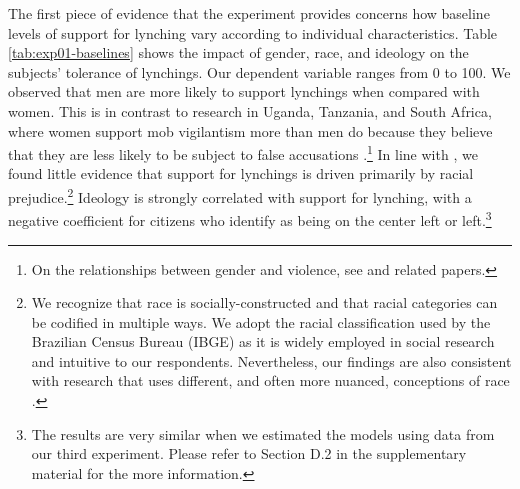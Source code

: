 \documentclass[12pt,ansiapaper]{article}
\begin{document}
The first piece of evidence that the experiment provides concerns how baseline levels of support for lynching vary according to individual characteristics. Table \ref{tab:exp01-baselines} shows the impact of gender, race, and ideology on the subjects' tolerance of lynchings. Our dependent variable ranges from 0 to 100. We observed that men are more likely to support lynchings when compared with women. This is in contrast to research in Uganda, Tanzania, and South Africa, where women support mob vigilantism more than men do because they believe that they are less likely to be subject to false accusations \citep{wilke2021gender}.\footnote{On the relationships between gender and violence, see \citet{kadera2018gendered} and related papers.} In line with \citet{martins2015linchamentos}, we found little evidence that support for lynchings is driven primarily by racial prejudice.\footnote{We recognize that race is socially-constructed and that racial categories can be codified in multiple ways. We adopt the racial classification used by the Brazilian Census Bureau (IBGE) as it is widely employed in social research \citep[e.g.][24]{lapop2018brazil} and intuitive to our respondents. Nevertheless, our findings are also consistent with research that uses different, and often more nuanced, conceptions of race \citep{monk2016consequences, schwartzman2020colour}. } Ideology is strongly correlated with support for lynching, with a negative coefficient for citizens who identify as being on the center left or left.\footnote{The results are very similar when we estimated the models using data from our third experiment. Please refer to Section D.2 in the supplementary material for the more information.}
\end{document}
